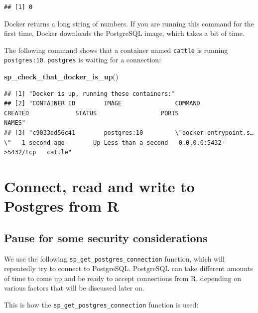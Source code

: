 \documentclass[]{book}
\newenvironment{Shaded}{\begin{snugshade}}{\end{snugshade}}
\newcommand{\KeywordTok}[1]{\textcolor[rgb]{0.13,0.29,0.53}{\textbf{#1}}}
\newcommand{\NormalTok}[1]{#1}
\theoremstyle{definition}
\theoremstyle{definition}
\theoremstyle{definition}
\theoremstyle{remark}
\begin{document}
\begin{verbatim}
## [1] 0
\end{verbatim}

Docker returns a long string of numbers. If you are running this command
for the first time, Docker downloads the PostgreSQL image, which takes a
bit of time.

The following command shows that a container named \texttt{cattle} is
running \texttt{postgres:10}. \texttt{postgres} is waiting for a
connection:

\begin{Shaded}
\begin{Highlighting}[]
\KeywordTok{sp_check_that_docker_is_up}\NormalTok{()}
\end{Highlighting}
\end{Shaded}

\begin{verbatim}
## [1] "Docker is up, running these containers:"                                                                                                       
## [2] "CONTAINER ID        IMAGE               COMMAND                  CREATED             STATUS                  PORTS                    NAMES"   
## [3] "c9033dd56c41        postgres:10         \"docker-entrypoint.s…\"   1 second ago        Up Less than a second   0.0.0.0:5432->5432/tcp   cattle"
\end{verbatim}

\hypertarget{connect-read-and-write-to-postgres-from-r}{%
\section{Connect, read and write to Postgres from
R}\label{connect-read-and-write-to-postgres-from-r}}

\hypertarget{pause-for-some-security-considerations}{%
\subsection{Pause for some security
considerations}\label{pause-for-some-security-considerations}}

We use the following \texttt{sp\_get\_postgres\_connection} function,
which will repeatedly try to connect to PostgreSQL. PostgreSQL can take
different amounts of time to come up and be ready to accept connections
from R, depending on various factors that will be discussed later on.

This is how the \texttt{sp\_get\_postgres\_connection} function is used:
\end{document}
